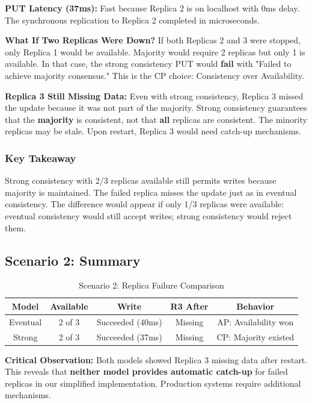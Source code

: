 \documentclass[10pt,a4paper]{article}
\begin{document}
\textbf{PUT Latency (37ms):} Fast because Replica 2 is on localhost with 0ms delay. The synchronous replication to Replica 2 completed in microseconds.

\textbf{What If Two Replicas Were Down?} If both Replicas 2 and 3 were stopped, only Replica 1 would be available. Majority would require 2 replicas but only 1 is available. In that case, the strong consistency PUT would \textbf{fail} with "Failed to achieve majority consensus." This is the CP choice: Consistency over Availability.

\textbf{Replica 3 Still Missing Data:} Even with strong consistency, Replica 3 missed the update because it was not part of the majority. Strong consistency guarantees that the \textbf{majority} is consistent, not that \textbf{all} replicas are consistent. The minority replicas may be stale. Upon restart, Replica 3 would need catch-up mechanisms.

\subsubsection{Key Takeaway}

Strong consistency with 2/3 replicas available still permits writes because majority is maintained. The failed replica misses the update just as in eventual consistency. The difference would appear if only 1/3 replicas were available: eventual consistency would still accept writes; strong consistency would reject them.

\subsection{Scenario 2: Summary}

\begin{table}[H]
\centering
\caption{Scenario 2: Replica Failure Comparison}
\begin{tabular}{|c|c|c|c|c|}
\hline
\textbf{Model} & \textbf{Available} & \textbf{Write} & \textbf{R3 After} & \textbf{Behavior} \\
\hline
Eventual & 2 of 3 & Succeeded (40ms) & Missing & AP: Availability won \\
Strong & 2 of 3 & Succeeded (37ms) & Missing & CP: Majority existed \\
\hline
\end{tabular}
\end{table}

\textbf{Critical Observation:} Both models showed Replica 3 missing data after restart. This reveals that \textbf{neither model provides automatic catch-up} for failed replicas in our simplified implementation. Production systems require additional mechanisms.
\end{document}
